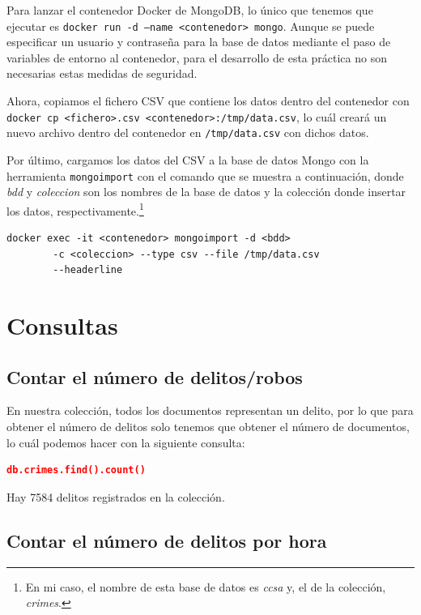 \documentclass{article}
\begin{document}
Para lanzar el contenedor Docker de MongoDB, lo único que tenemos que ejecutar
es \texttt{docker run -d --name <contenedor> mongo}. Aunque se puede
especificar un usuario y contraseña para la base de datos mediante el paso de
variables de entorno al contenedor, para el desarrollo de esta práctica no son
necesarias estas medidas de seguridad.

Ahora, copiamos el fichero CSV que contiene los datos dentro del contenedor con
\texttt{docker cp <fichero>.csv <contenedor>:/tmp/data.csv}, lo cuál creará
un nuevo archivo dentro del contenedor en \texttt{/tmp/data.csv} con dichos
datos.

Por último, cargamos los datos del CSV a la base de datos Mongo con la
herramienta \texttt{mongoimport} con el comando que se muestra a
continuación, donde \textit{bdd} y \textit{coleccion} son los nombres de la base
de datos y la colección donde insertar los datos, respectivamente.\footnote{En
    mi caso, el nombre de esta base de datos es \textit{ccsa} y, el de la colección,
    \textit{crimes}.}

\begin{lstlisting}[frame=lines]
    docker exec -it <contenedor> mongoimport -d <bdd>
        -c <coleccion> --type csv --file /tmp/data.csv
        --headerline
\end{lstlisting}

\section{Consultas}

\subsection{Contar el número de delitos/robos}

En nuestra colección, todos los documentos representan un delito, por lo que
para obtener el número de delitos solo tenemos que obtener el número de
documentos, lo cuál podemos hacer con la siguiente consulta:

\begin{lstlisting}[language=JSON]
    db.crimes.find().count()
\end{lstlisting}

Hay 7584 delitos registrados en la colección.

\subsection{Contar el número de delitos por hora}
\end{document}
